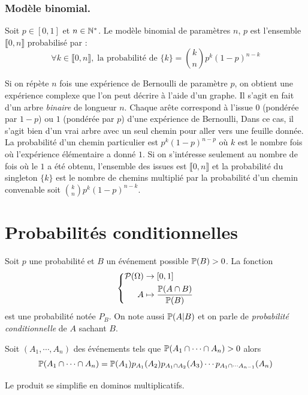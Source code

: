 \subsubsection{Modèle binomial.}
\begin{defi}
  Soit $p\in [0,1]$ et $n\in \mathbb{N}^*$. Le modèle binomial de paramètres $n$, $p$ est l'ensemble $\llbracket 0 , n \rrbracket$ probabilisé par :
  \begin{displaymath}
    \forall k \in \llbracket 0 , n \rrbracket, \; \text{la probabilité de } \{k\} = \binom{k}{n}p^k(1-p)^{n-k}
  \end{displaymath}
\end{defi}
Si on répète $n$ fois une expérience de Bernoulli de paramètre $p$, on obtient une expérience complexe que l'on peut décrire à l'aide d'un graphe. Il s'agit en fait d'un arbre \emph{binaire} de longueur $n$. Chaque arête correspond à l'issue $0$ (pondérée par $1-p$) ou $1$ (pondérée par $p$) d'une expérience de Bernoulli, Dans ce cas, il s'agit bien d'un vrai arbre avec un seul chemin pour aller vers une feuille donnée.\newline
La probabilité d'un chemin particulier est $p^k(1-p)^{n-p}$ où $k$ est le nombre fois où l'expérience élémentaire a donné $1$. Si on s'intéresse seulement au nombre de fois où le $1$ a été obtenu, l'ensemble des issues est $\llbracket 0, n \rrbracket$ et la probabilité du singleton $\{k\}$ est le nombre de chemins multiplié par la probabilité d'un chemin convenable soit $\binom{k}{n}p^k(1-p)^{n-k}$.



\section{Probabilités conditionnelles}
Soit $p$ une probabilité et $B$ un événement possible $\mathbb{P}(B)>0$. La fonction
\begin{displaymath}
 \left\lbrace 
\begin{aligned}
 \mathcal{P}(\Omega) &\rightarrow [0,1] \\
 A &\mapsto \frac{\mathbb{P}(A\cap B)}{\mathbb{P}(B)}
\end{aligned}
\right. 
\end{displaymath}
est une probabilité notée $P_B$. On note aussi $\mathbb{P}(A|B)$ et on parle de \emph{probabilité conditionnelle} de $A$ sachant $B$.

\begin{prop}
 Soit $(A_1,\cdots,A_n)$ des événements tels que $\mathbb{P}(A_1\cap \cdots \cap A_n)>0$ alors
\begin{displaymath}
 \mathbb{P}(A_1\cap \cdots \cap A_n) = \mathbb{P}(A_1)p_{A_1}(A_2)p_{A_1\cap A_2}(A_3) \cdots p_{A_1\cap \cdots A_{n-1}}(A_n)
\end{displaymath}
\end{prop}
\begin{demo}
  Le produit se simplifie en dominos multiplicatifs.
\end{demo}


